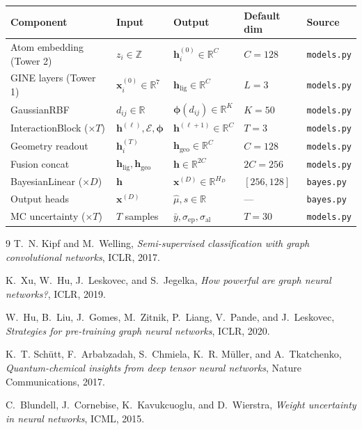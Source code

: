\documentclass[11pt,a4paper]{article}
\newcommand{\R}{\mathbb{R}}
\newcommand{\bx}{\mathbf{x}}
\newcommand{\bh}{\mathbf{h}}
\newcommand{\bphi}{\boldsymbol{\phi}}
\newcommand{\code}[1]{\texttt{#1}}
\begin{document}
\begin{center}
\renewcommand{\arraystretch}{1.4}
\begin{tabular}{lllll}
\toprule
\textbf{Component} & \textbf{Input} & \textbf{Output} & \textbf{Default dim} & \textbf{Source} \\
\midrule
Atom embedding (Tower 2) & $z_i \in \mathbb{Z}$ & $\bh_i^{(0)} \in \R^C$ & $C=128$ & \code{models.py} \\
GINE layers (Tower 1)    & $\bx_i^{(0)} \in \R^7$ & $\bh_{\mathrm{lig}} \in \R^C$ & $L=3$ & \code{models.py} \\
GaussianRBF              & $d_{ij} \in \R$ & $\bphi(d_{ij}) \in \R^K$ & $K=50$ & \code{models.py} \\
InteractionBlock (×$T$)  & $\bh^{(\ell)}, \mathcal{E}, \bphi$ & $\bh^{(\ell+1)} \in \R^C$ & $T=3$ & \code{models.py} \\
Geometry readout         & $\bh_i^{(T)}$ & $\bh_{\mathrm{geo}} \in \R^C$ & $C=128$ & \code{models.py} \\
Fusion concat            & $\bh_{\mathrm{lig}}, \bh_{\mathrm{geo}}$ & $\mathbf{h} \in \R^{2C}$ & $2C=256$ & \code{models.py} \\
BayesianLinear (×$D$)    & $\mathbf{h}$ & $\mathbf{x}^{(D)} \in \R^{H_D}$ & $[256,128]$ & \code{bayes.py} \\
Output heads             & $\mathbf{x}^{(D)}$ & $\hat{\mu}, s \in \R$ & --- & \code{bayes.py} \\
MC uncertainty (×$T$)   & $T$ samples & $\bar{y}, \sigma_{\mathrm{ep}}, \sigma_{\mathrm{al}}$ & $T=30$ & \code{models.py} \\
\bottomrule
\end{tabular}
\end{center}

\begin{thebibliography}{9}
T.~N. Kipf and M.~Welling,
\textit{Semi-supervised classification with graph convolutional networks},
ICLR, 2017.

K.~Xu, W.~Hu, J.~Leskovec, and S.~Jegelka,
\textit{How powerful are graph neural networks?},
ICLR, 2019.

W.~Hu, B.~Liu, J.~Gomes, M.~Zitnik, P.~Liang, V.~Pande, and J.~Leskovec,
\textit{Strategies for pre-training graph neural networks},
ICLR, 2020.

K.~T. Sch\"{u}tt, F.~Arbabzadah, S.~Chmiela, K.~R. M\"{u}ller, and
A.~Tkatchenko,
\textit{Quantum-chemical insights from deep tensor neural networks},
Nature Communications, 2017.

C.~Blundell, J.~Cornebise, K.~Kavukcuoglu, and D.~Wierstra,
\textit{Weight uncertainty in neural networks},
ICML, 2015.
\end{thebibliography}
\end{document}
